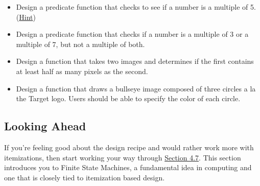 \documentclass[nobib]{tufte-handout}
\begin{document}
\begin{itemize}
  \item Design a predicate function that checks to see if a number is a multiple of 5. (\href{https://docs.racket-lang.org/htdp-langs/beginner.html?q=remainder#%28def._htdp-beginner._%28%28lib._lang%2Fhtdp-beginner..rkt%29._remainder%29%29}{Hint})
  \item Design a predicate function that checks if a number is a multiple of 3 or a multiple of 7, but not a multiple of both.
  \item Design a function that takes two images and determines if the first contains at least half as many pixels as the second.
  \item Design a function that draws a bullseye image composed of three circles a la the Target logo. Users should be able to specify the color of each circle.
\end{itemize}

\subsection*{ Looking Ahead }

If you're feeling good about the design recipe and would rather work more with itemizations, then start working your way through \href{http://htdp.org/2018-01-06/Book/part_one.html#%28part._sec~3aworlds-more%29}{Section 4.7}. This section introduces you to Finite State Machines, a fundamental idea in computing and one that is closely tied to itemization based design.
\end{document}

